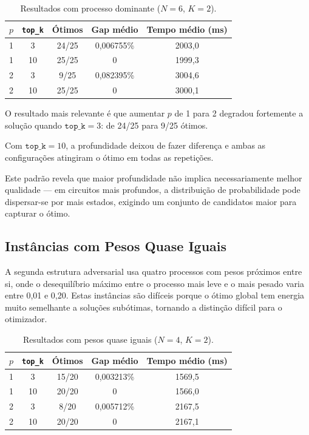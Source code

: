 \begin{table}[H]
\centering
\begin{tabular}{|c|c|c|c|c|}
\hline
\textbf{$p$} & \textbf{\texttt{top\_k}} & \textbf{Ótimos} & \textbf{Gap médio} & \textbf{Tempo médio (ms)} \\
\hline
1 & 3  & 24/25 & 0,006755\% & 2003,0 \\
1 & 10 & 25/25 & 0          & 1999,3 \\
2 & 3  & 9/25  & 0,082395\% & 3004,6 \\
2 & 10 & 25/25 & 0          & 3000,1 \\
\hline
\end{tabular}
\caption{Resultados com processo dominante ($N=6$, $K=2$).}
\label{tab:resultados-e1a}
\end{table}

O resultado mais relevante é que aumentar $p$ de 1 para 2 degradou fortemente a
solução quando $\mathtt{top\_k}=3$: de 24/25 para 9/25 ótimos. 

Com
$\mathtt{top\_k}=10$, a profundidade deixou de fazer diferença e ambas as configurações
atingiram o ótimo em todas as repetições. 

Este padrão revela que maior profundidade não
implica necessariamente melhor qualidade --- em circuitos mais profundos, a distribuição
de probabilidade pode dispersar-se por mais estados, exigindo um conjunto de candidatos
maior para capturar o ótimo.

\subsection{Instâncias com Pesos Quase Iguais}

A segunda estrutura adversarial usa quatro processos com pesos próximos entre si, onde
o desequilíbrio máximo entre o processo mais leve e o mais pesado varia entre 0,01 e
0,20. Estas instâncias são difíceis porque o ótimo global tem energia muito semelhante
a soluções subótimas, tornando a distinção difícil para o otimizador.

\begin{table}[H]
\centering
\begin{tabular}{|c|c|c|c|c|}
\hline
\textbf{$p$} & \textbf{\texttt{top\_k}} & \textbf{Ótimos} & \textbf{Gap médio} & \textbf{Tempo médio (ms)} \\
\hline
1 & 3  & 15/20 & 0,003213\% & 1569,5 \\
1 & 10 & 20/20 & 0          & 1566,0 \\
2 & 3  & 8/20  & 0,005712\% & 2167,5 \\
2 & 10 & 20/20 & 0          & 2167,1 \\
\hline
\end{tabular}
\caption{Resultados com pesos quase iguais ($N=4$, $K=2$).}
\label{tab:resultados-e1b}
\end{table}

